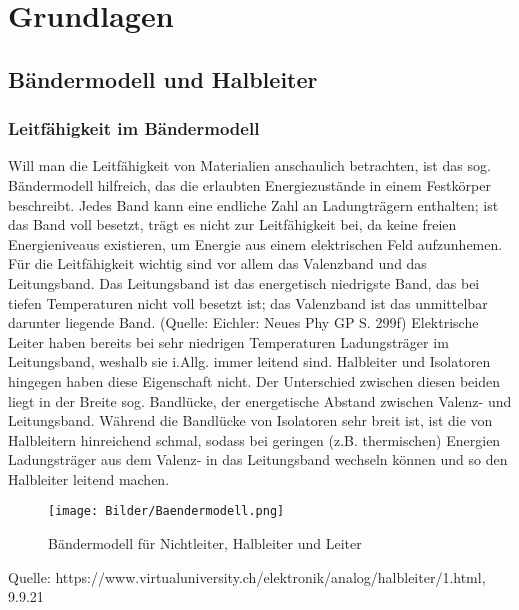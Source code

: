 
\section{Grundlagen}
\subsection{Bändermodell und Halbleiter}
\subsubsection{Leitfähigkeit im Bändermodell}
Will man die Leitfähigkeit von Materialien anschaulich betrachten, ist das sog. Bändermodell hilfreich, das die erlaubten Energiezustände in einem Festkörper beschreibt. Jedes Band kann eine endliche Zahl an Ladungträgern enthalten; ist das Band voll besetzt, trägt es nicht zur Leitfähigkeit bei, da keine freien Energieniveaus existieren, um Energie aus einem elektrischen Feld aufzunhemen. Für die Leitfähigkeit wichtig sind vor allem das Valenzband und das Leitungsband. Das Leitungsband ist das energetisch niedrigste Band, das bei tiefen Temperaturen nicht voll besetzt ist; das Valenzband ist das unmittelbar darunter liegende Band. (Quelle: Eichler: Neues Phy GP S. 299f)
Elektrische Leiter haben bereits bei sehr niedrigen Temperaturen Ladungsträger im Leitungsband, weshalb sie i.Allg. immer leitend sind. Halbleiter und Isolatoren hingegen haben diese Eigenschaft nicht. Der Unterschied zwischen diesen beiden liegt in der Breite sog. Bandlücke, der energetische Abstand zwischen Valenz- und Leitungsband. Während die Bandlücke von Isolatoren sehr breit ist, ist die von Halbleitern hinreichend schmal, sodass bei geringen (z.B. thermischen) Energien Ladungsträger aus dem Valenz- in das Leitungsband wechseln können und so den Halbleiter leitend machen. \\
\begin{figure}[h]
    \centering
    \texttt{[image: Bilder/Baendermodell.png]}
    \caption{Bändermodell für Nichtleiter, Halbleiter und Leiter}
\end{figure}
Quelle: https://www.virtualuniversity.ch/elektronik/analog/halbleiter/1.html, 9.9.21


